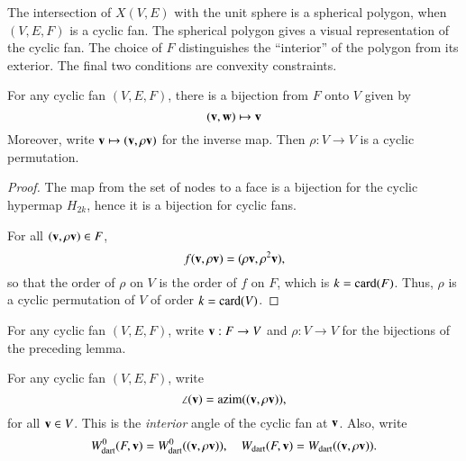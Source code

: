 The intersection of $X(V,E)$ with the unit sphere is a spherical polygon, when $(V,E,F)$ is a cyclic fan.  The spherical polygon gives a visual representation of the cyclic fan. The choice of $F$ distinguishes the ``interior'' of the polygon from its exterior.  The final two conditions are convexity constraints.  



\begin{lemma}  
For any cyclic fan $(V,E,F)$, there is a bijection from $F$ onto $V$ given by
$$
 ({\mathbf v},{\mathbf w}) \mapsto {\mathbf v}
$$
Moreover, write ${\mathbf v}\mapsto({\mathbf v},\rho{\mathbf v})$ for the inverse map. 
Then $\rho:V\to V$ is a cyclic permutation.
\end{lemma}
%

\begin{proof}  The map from the set of nodes to a face is a bijection for the cyclic hypermap $H_{2k}$, hence it is a bijection for cyclic fans.

For all $({\mathbf v},\rho {\mathbf v})\in F$,
$$f({\mathbf v},\rho {\mathbf v}) = (\rho{\mathbf v},\rho^2{\mathbf v}),$$
so that the order of $\rho$ on $V$ is the order of $f$ on $F$, which is $k={\operatorname{card}}(F)$.  Thus, $\rho$ is a cyclic permutation of $V$ of order $k={\operatorname{card}}(V)$.
\end{proof}

\begin{definition}[$\rho$,~$\v$]  For any cyclic fan $(V,E,F)$, 
write ${\mathbf v}:F\to V$ and $\rho:V\to V$ for the bijections of the preceding lemma.
\end{definition}
%
%

\begin{definition}
For any cyclic fan $(V,E,F)$,
 write
$$
\angle({\mathbf v}) = {\operatorname{azim}}(({\mathbf v},\rho{\mathbf v})),
$$
for all ${\mathbf v}\in V$.  This is the {\it interior} angle of the cyclic fan at $\v$.
Also, write
$$
W^0_{\text{dart}}(F,{\mathbf v}) = W^0_{\text{dart}}(({\mathbf v},\rho {\mathbf v})),\quad W_{\text{dart}}(F,{\mathbf v}) =W_{\text{dart}}(({\mathbf v},\rho {\mathbf v})).
$$
%
%
%
\end{definition}






